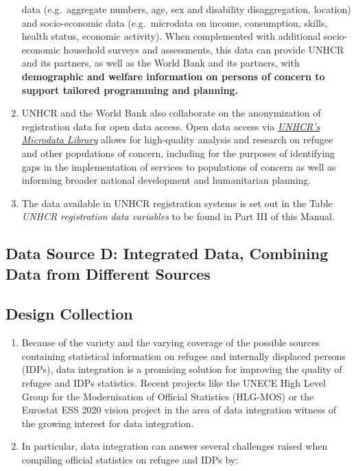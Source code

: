 \documentclass[
]{article}
\begin{document}
\begin{enumerate}
  data (e.g.~aggregate numbers, age, sex and disability
  disaggregation, location) and socio-economic data (e.g.~microdata on
  income, consumption, skills, health status, economic activity). When
  complemented with additional socio-economic household surveys and
  assessments, this data can provide UNHCR and its partners, as well
  as the World Bank and its partners, with \textbf{demographic and welfare
  information on persons of concern to support tailored programming
  and planning.}
\item
  UNHCR and the World Bank also collaborate on the anonymization of
  registration data for open data access. Open data access via
  \href{https://microdata.unhcr.org/index.php/home}{\emph{UNHCR's Microdata
  Library}} allows for
  high-quality analysis and research on refugee and other populations
  of concern, including for the purposes of identifying gaps in the
  implementation of services to populations of concern as well as
  informing broader national development and humanitarian planning.
\item
  The data available in UNHCR registration systems is set out in the
  Table \emph{UNHCR registration data variables} to be found in Part III of
  this Manual.
\end{enumerate}

\hypertarget{data-source-d-integrated-data-combining-data-from-different-sources}{%
\subsection{Data Source D: Integrated Data, Combining Data from Different Sources}\label{data-source-d-integrated-data-combining-data-from-different-sources}}

\hypertarget{design-collection-3}{%
\subsection{Design Collection}\label{design-collection-3}}

\begin{enumerate}
\def\labelenumi{\arabic{enumi}.}
\setcounter{enumi}{195}
\item
  Because of the variety and the varying coverage of the possible
  sources containing statistical information on refugee and internally
  displaced persons (IDPs), data integration is a promising solution
  for improving the quality of refugee and IDPs statistics. Recent
  projects like the UNECE High Level Group for the Modernisation of
  Official Statistics (HLG-MOS) or the Eurostat ESS 2020 vision
  project in the area of data integration witness of the growing
  interest for data integration.
\item
  In particular, data integration can answer several challenges
  raised when compiling official statistics on refugee and IDPs by:
\end{enumerate}
\end{document}
